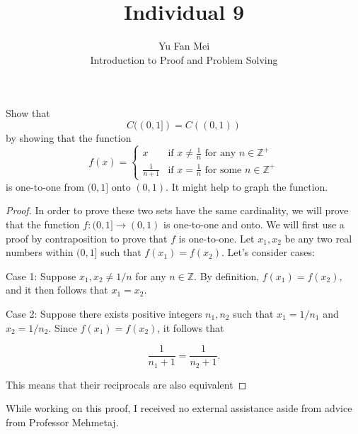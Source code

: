 \documentclass[12pt]{article}
\newenvironment{problem}[2][Problem]{\begin{trivlist}
\item[\hskip \labelsep {\bfseries #1}\hskip \labelsep {\bfseries #2.}]}{\end{trivlist}}
\begin{document}

\title{Individual 9}%
\author{Yu Fan Mei\\
	Introduction to Proof and Problem Solving} %

\maketitle

\begin{problem}{1}
    Show that  
\[
C((0, 1]) = C((0, 1))
\]  
by showing that the function  
\[
f(x) = 
\begin{cases} 
x & \text{if } x \neq \frac{1}{n} \text{ for any } n \in \mathbb{Z}^+ \\
\frac{1}{n+1} & \text{if } x = \frac{1}{n} \text{ for some } n \in \mathbb{Z}^+
\end{cases}
\]
is one-to-one from \((0, 1]\) onto \((0, 1)\). It might help to graph the function.
\end{problem}

\begin{proof} In order to prove these two sets have the same cardinality, we will prove that the function $f : (0, 1] \to (0, 1) $ is one-to-one and onto. We will first use a proof by contraposition to prove that $f$ is one-to-one. Let $x_1, x_2$ be any two real numbers within $(0, 1]$ such that $f(x_1) = f(x_2)$. Let's consider cases:
    
    Case 1: Suppose $x_1, x_2 \neq 1/n$ for any $n \in \mathbb{Z}$. By definition, $f(x_1) = f(x_2),$ and it then follows that $x_1 = x_2$. 
    
    Case 2: Suppose there exists positive integers $n_1, n_2$ such that $x_1 = 1/n_1$ and $x_2 = 1/n_2$. Since $f(x_1) = f(x_2)$, it follows that

    $$\frac{1}{n_1 + 1} = \frac{1}{n_2 + 1}.$$

    This means that their reciprocals are also equivalent 

\end{proof}


\noindent While working on this proof, I received no external assistance aside from advice from Professor Mehmetaj.
\end{document}
